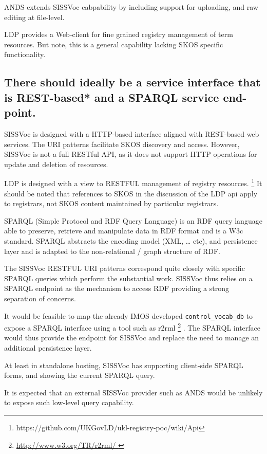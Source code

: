 \documentclass[10pt,a4paper]{article}
\begin{document}
\begin{flushleft}
  ANDS extends SISSVoc cabpability by including support for uploading, and raw editing
  at file-level. 

  LDP provides a Web-client for fine grained registry management of term
resources. But note, this is a general capability lacking SKOS specific functionality.


\subsection{ 
  There should ideally be a service interface that is REST-based* and a SPARQL service end-point.
}

    SISSVoc is designed with a HTTP-based interface aligned with REST-based web
services. The URI patterns facilitate SKOS discovery and access. However,
SISSVoc is not a full RESTful API, as it does not support HTTP operations for
update and deletion of resources.
    
    LDP is designed with a view to RESTFUL management of registry resources.
\footnote { https://github.com/UKGovLD/ukl-registry-poc/wiki/Api } It should be
noted that references to SKOS in the discussion of the LDP api apply to
registrars, not SKOS content maintained by particular registrars.  


    SPARQL (Simple Protocol and RDF Query Language) is an RDF query language
able to preserve, retrieve and manipulate data in RDF format and is a W3c
standard.  SPARQL abstracts the encoding model (XML, … etc), and persistence
layer and is adapted to the non-relational / graph structure of RDF.

    The SISSVoc RESTFUL URI patterns correspond quite closely with specific SPARQL queries
which perform the substantial work. SISSVoc thus relies on a SPARQL endpoint as the
mechanism to access RDF providing a strong separation of concerns.

    It would be feasible to map the already IMOS developed
\texttt{control\_vocab\_db} to expose a SPARQL interface using a tool such as
r2rml \footnote{ \url{ http://www.w3.org/TR/r2rml/ } } .  The SPARQL interface
would thus provide the endpoint for SISSVoc and replace the need to manage an
additional persistence layer.

	At least in standalone hosting, SISSVoc has supporting client-side SPARQL forms, 
	and showing the current SPARQL query.

    It is expected that an external SISSVoc provider such as ANDS would be
unlikely to expose such low-level query capability.
   


\end{flushleft}
\end{document}
